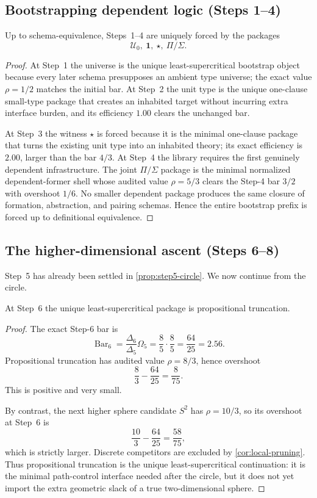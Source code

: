 \documentclass{lmcs}
\newcommand{\U}{\mathcal{U}}
\newcommand{\SelBar}{\operatorname{Bar}}
\begin{document}
\subsection{Bootstrapping dependent logic (Steps 1--4)}

\begin{prop}
\label{prop:bootstrap}
Up to schema-equivalence, Steps~1--4 are uniquely forced by the packages
\[
  \U_0,\ \mathbf 1,\ \star,\ \Pi/\Sigma.
\]
\end{prop}

\begin{proof}
At Step~1 the universe is the unique least-supercritical bootstrap object because every later schema presupposes an ambient type universe; the exact value $\rho=1/2$ matches the initial bar. At Step~2 the unit type is the unique one-clause small-type package that creates an inhabited target without incurring extra interface burden, and its efficiency $1.00$ clears the unchanged bar.

At Step~3 the witness $\star$ is forced because it is the minimal one-clause package that turns the existing unit type into an inhabited theory; its exact efficiency is $2.00$, larger than the bar $4/3$. At Step~4 the library requires the first genuinely dependent infrastructure. The joint $\Pi/\Sigma$ package is the minimal normalized dependent-former shell whose audited value $\rho=5/3$ clears the Step-4 bar $3/2$ with overshoot $1/6$. No smaller dependent package produces the same closure of formation, abstraction, and pairing schemas. Hence the entire bootstrap prefix is forced up to definitional equivalence.
\end{proof}

\subsection{The higher-dimensional ascent (Steps 6--8)}

Step~5 has already been settled in \autoref{prop:step5-circle}. We now continue from the circle.

\begin{prop}
\label{prop:step6}
At Step~6 the unique least-supercritical package is propositional truncation.
\end{prop}

\begin{proof}
The exact Step-6 bar is
\[
  \SelBar_6 = \frac{\Delta_6}{\Delta_5}\Omega_5 = \frac{8}{5}\cdot\frac{8}{5} = \frac{64}{25} = 2.56.
\]
Propositional truncation has audited value $\rho = 8/3$, hence overshoot
\[
  \frac{8}{3} - \frac{64}{25} = \frac{8}{75}.
\]
This is positive and very small.

By contrast, the next higher sphere candidate $S^2$ has $\rho = 10/3$, so its overshoot at Step~6 is
\[
  \frac{10}{3} - \frac{64}{25} = \frac{58}{75},
\]
which is strictly larger. Discrete competitors are excluded by \autoref{cor:local-pruning}. Thus propositional truncation is the unique least-supercritical continuation: it is the minimal path-control interface needed after the circle, but it does not yet import the extra geometric slack of a true two-dimensional sphere.
\end{proof}
\end{document}
